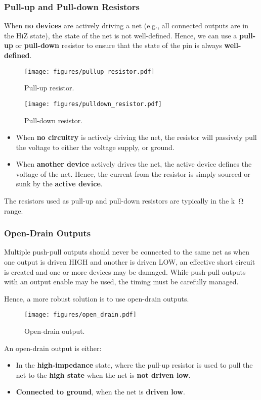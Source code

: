 \documentclass{article}
\begin{document}
\subsubsection{Pull-up and Pull-down Resistors}
When \textbf{no devices} are actively driving a net (e.g., all
connected outputs are in the HiZ state), the state of the net is not
well-defined. Hence, we can use a \textbf{pull-up} or
\textbf{pull-down} resistor to ensure that the state of the pin is
always \textbf{well-defined}.
\begin{multicols}{2}
    \begin{figure}[H]
        \centering
        \texttt{[image: figures/pullup\_resistor.pdf]}
        \caption{Pull-up resistor.} %
    \end{figure}
    \begin{figure}[H]
        \centering
        \texttt{[image: figures/pulldown\_resistor.pdf]}
        \caption{Pull-down resistor.} %
    \end{figure}
\end{multicols}
\begin{itemize}
    \item When \textbf{no circuitry} is actively driving the net, the
          resistor will passively pull the voltage to either the
          voltage supply, or ground.
    \item When \textbf{another device} actively drives the net, the
          active device defines the voltage of the net. Hence, the
          current from the resistor is simply sourced or sunk by the
          \textbf{active device}.
\end{itemize}
The resistors used as pull-up and pull-down resistors are typically in the \unit{k\ohm} range.
\subsubsection{Open-Drain Outputs}
Multiple push-pull outputs should never be connected to the same net as
when one output is driven HIGH and another is driven LOW, an effective
short circuit is created and one or more devices may be damaged. While
push-pull outputs with an output enable may be used, the timing must be
carefully managed.

Hence, a more robust solution is to use open-drain outputs.
\begin{figure}[H]
    \centering
    \texttt{[image: figures/open\_drain.pdf]}
    \caption{Open-drain output.} %
\end{figure}
An open-drain output is either:
\begin{itemize}
    \item In the \textbf{high-impedance} state, where the pull-up
          resistor is used to pull the net to the \textbf{high state}
          when the net is \textbf{not driven low}.
    \item \textbf{Connected to ground}, when the net is \textbf{driven low}.
\end{itemize}
\end{document}
